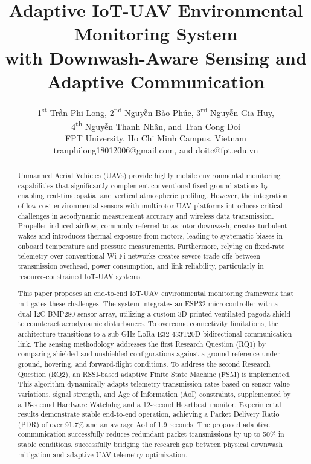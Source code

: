 \documentclass[11pt, a4paper]{article}
\title{Adaptive IoT-UAV Environmental Monitoring System \\ with Downwash-Aware Sensing and Adaptive Communication}
\author{
1\textsuperscript{st} Trần Phi Long, 2\textsuperscript{nd} Nguyễn Bảo Phúc, 3\textsuperscript{rd} Nguyễn Gia Huy, \\
4\textsuperscript{th} Nguyễn Thanh Nhân, and Tran Cong Doi \\
FPT University, Ho Chi Minh Campus, Vietnam \\
tranphilong18012006@gmail.com, and doitc@fpt.edu.vn
}
\date{}
\begin{document}
\maketitle


\begin{abstract}
Unmanned Aerial Vehicles (UAVs) provide highly mobile environmental monitoring capabilities that significantly complement conventional fixed ground stations by enabling real-time spatial and vertical atmospheric profiling. However, the integration of low-cost environmental sensors with multirotor UAV platforms introduces critical challenges in aerodynamic measurement accuracy and wireless data transmission. Propeller-induced airflow, commonly referred to as rotor downwash, creates turbulent wakes and introduces thermal exposure from motors, leading to systematic biases in onboard temperature and pressure measurements. Furthermore, relying on fixed-rate telemetry over conventional Wi-Fi networks creates severe trade-offs between transmission overhead, power consumption, and link reliability, particularly in resource-constrained IoT-UAV systems. 

This paper proposes an end-to-end IoT-UAV environmental monitoring framework that mitigates these challenges. The system integrates an ESP32 microcontroller with a dual-I2C BMP280 sensor array, utilizing a custom 3D-printed ventilated pagoda shield to counteract aerodynamic disturbances. To overcome connectivity limitations, the architecture transitions to a sub-GHz LoRa E32-433T20D bidirectional communication link. The sensing methodology addresses the first Research Question (RQ1) by comparing shielded and unshielded configurations against a ground reference under ground, hovering, and forward-flight conditions. To address the second Research Question (RQ2), an RSSI-based adaptive Finite State Machine (FSM) is implemented. This algorithm dynamically adapts telemetry transmission rates based on sensor-value variations, signal strength, and Age of Information (AoI) constraints, supplemented by a 15-second Hardware Watchdog and a 12-second Heartbeat monitor. Experimental results demonstrate stable end-to-end operation, achieving a Packet Delivery Ratio (PDR) of over 91.7\% and an average AoI of 1.9 seconds. The proposed adaptive communication successfully reduces redundant packet transmissions by up to 50\% in stable conditions, successfully bridging the research gap between physical downwash mitigation and adaptive UAV telemetry optimization.
\end{abstract}
\end{document}

